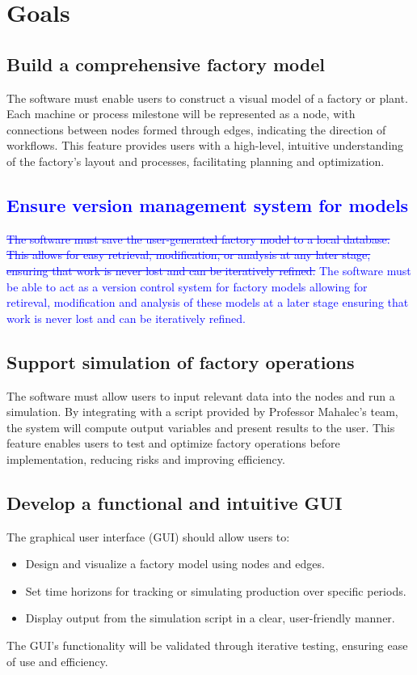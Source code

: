 \documentclass{article}
\begin{document}
\section{Goals}

\subsection{Build a comprehensive factory model}
The software must enable users to construct a visual model of a factory or plant. Each machine or process milestone will be represented as a node, with connections between nodes formed through edges, indicating the direction of workflows. This feature provides users with a high-level, intuitive understanding of the factory's layout and processes, facilitating planning and optimization.

\subsection{\textcolor{blue}{Ensure version management system for models}}
\textcolor{blue}{\sout{The software must save the user-generated factory model to a local database. This allows for easy retrieval, modification, or analysis at any later stage, ensuring that work is never lost and can be iteratively refined.}}
\textcolor{blue}{The software must be able to act as a version control system for factory models allowing for retireval, modification and analysis of these models at a later stage ensuring that work is never lost and can be iteratively refined.}

\subsection{Support simulation of factory operations}
The software must allow users to input relevant data into the nodes and run a simulation. By integrating with a script provided by Professor Mahalec's team, the system will compute output variables and present results to the user. This feature enables users to test and optimize factory operations before implementation, reducing risks and improving efficiency.

\subsection{Develop a functional and intuitive GUI}
The graphical user interface (GUI) should allow users to:
\begin{itemize}
    \item Design and visualize a factory model using nodes and edges.
    \item Set time horizons for tracking or simulating production over specific periods.
    \item Display output from the simulation script in a clear, user-friendly manner.
\end{itemize}
The GUI's functionality will be validated through iterative testing, ensuring ease of use and efficiency.
\end{document}
